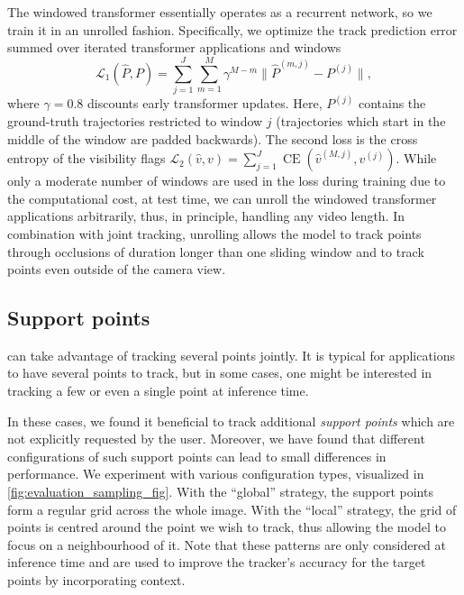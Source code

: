 The windowed transformer essentially operates as a recurrent network, so we train it in an unrolled fashion.
Specifically, we optimize the track prediction error summed over iterated transformer applications and windows
\begin{equation}\label{e:loss1}
\mathcal{L}_1(\hat{P}, P)
=
\sum_{j=1}^{J}
\sum_{m=1}^{M}
\gamma^{M-m}
\|
\hat P^{(m,j)} - P^{(j)}
\|,
\end{equation}
where $\gamma=0.8$ discounts early transformer updates.
Here, $P^{(j)}$ contains the ground-truth trajectories restricted to window $j$ (trajectories which start in the middle of the window are padded backwards).
The second loss is the cross entropy of the visibility flags
$
\mathcal{L}_2(\hat{v}, v)
=
\sum_{j=1}^{J}
\operatorname{CE}(
  \hat v^{(M,j)},
  v^{(j)}
)
$.
While only a moderate number of windows are used in the loss during training due to the computational cost, at test time, we can unroll the windowed transformer applications arbitrarily, thus, in principle, handling any video length. In combination with joint tracking, unrolling allows the model to track points through occlusions of duration longer than one sliding window and to track points even outside of the camera view.

\subsection{Support points}%
\label{sec:point_selection}

\method can take advantage of tracking several points jointly.
It is typical for applications to have several points to track, but in some cases, one might be interested in tracking a few or even a single point at inference time.

In these cases, we found it beneficial to track additional \textit{support points} which are not explicitly requested by the user.
Moreover, we have found that different configurations of such support points can lead to small differences in performance.
We experiment with various configuration types, visualized in \cref{fig:evaluation_sampling_fig}.
With the ``global'' strategy, the support points form a regular grid across the whole image.
With the ``local'' strategy, the grid of points is centred around the point we wish to track, thus allowing the model to focus on a neighbourhood of it.
Note that these patterns are only considered at inference time and are used to improve the tracker's accuracy for the target points by incorporating context.
